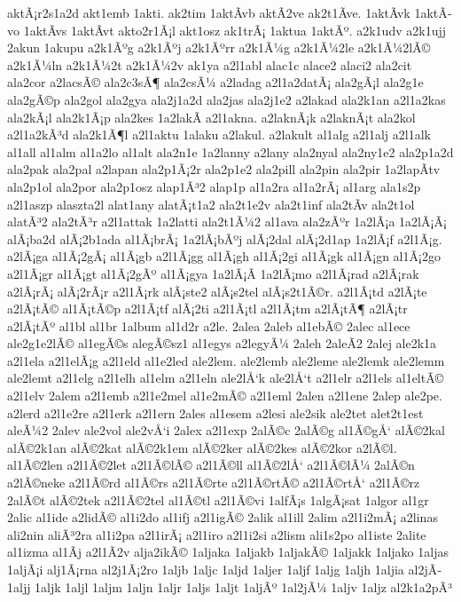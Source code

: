 {aktÃ¡r2s1a2d
akt1emb
1akti.
ak2tim
1aktÃ­vb
aktÃ­2ve
ak2t1Ã­ve.
1aktÃ­vk
1aktÃ­vo
1aktÃ­vs
1aktÃ­vt
akto2r1Ã¡l
akt1osz
ak1trÃ¡
1aktua
1aktÃº.
a2k1udv
a2k1ujj
2akun
1akupu
a2k1Ãºg
a2k1Ãºj
a2k1Ãºrr
a2k1Ã¼g
a2k1Ã¼2le
a2k1Ã¼2lÃ©
a2k1Ã¼ln
a2k1Ã¼2t
a2k1Ã¼2v
ak1ya
a2l1abl
alac1c
alace2
alaci2
ala2cit
ala2cor
a2lacsÃ©
ala2c3sÃ¶
ala2csÃ¼
a2ladag
a2l1a2datÃ¡
ala2gÃ¡l
ala2g1e
ala2gÃ©p
ala2gol
ala2gya
ala2j1a2d
ala2jas
ala2j1e2
a2lakad
ala2k1an
a2l1a2kas
ala2kÃ¡l
ala2k1Ã¡p
ala2kes
1a2lakÃ­
a2l1akna.
a2laknÃ¡k
a2laknÃ¡t
ala2kol
a2l1a2kÃ³d
ala2k1Ã¶l
a2l1aktu
1alaku
a2lakul.
a2lakult
al1alg
a2l1alj
a2l1alk
al1all
al1alm
al1a2lo
al1alt
ala2n1e
1a2lanny
a2lany
ala2nyal
ala2ny1e2
ala2p1a2d
ala2pak
ala2pal
a2lapan
ala2p1Ã¡2r
ala2p1e2
ala2pill
ala2pin
ala2pir
1a2lapÃ­tv
ala2p1ol
ala2por
ala2p1osz
alap1Ã³2
alap1p
al1a2ra
al1a2rÃ¡
al1arg
ala1s2p
a2l1aszp
alaszta2l
alat1any
alatÃ¡t1a2
ala2t1e2v
ala2t1inf
ala2tÃ­v
ala2t1ol
alatÃ³2
ala2tÃ³r
a2l1attak
1a2latti
ala2t1Ã¼2
al1ava
ala2zÃºr
1a2lÃ¡a
1a2lÃ¡Ã¡
alÃ¡ba2d
alÃ¡2b1ada
al1Ã¡brÃ¡
1a2lÃ¡bÃºj
alÃ¡2dal
alÃ¡2d1ap
1a2lÃ¡f
a2l1Ã¡g.
a2lÃ¡ga
al1Ã¡2gÃ¡
al1Ã¡gb
a2l1Ã¡gg
al1Ã¡gh
al1Ã¡2gi
al1Ã¡gk
al1Ã¡gn
al1Ã¡2go
a2l1Ã¡gr
al1Ã¡gt
al1Ã¡2gÃº
al1Ã¡gya
1a2lÃ¡Ã­
1a2lÃ¡mo
a2l1Ã¡rad
a2lÃ¡rak
a2lÃ¡rÃ¡
alÃ¡2rÃ¡r
a2l1Ã¡rk
alÃ¡ste2
alÃ¡s2tel
alÃ¡s2t1Ã©r.
a2l1Ã¡td
a2lÃ¡te
a2lÃ¡tÃ©
al1Ã¡tÃ©p
a2l1Ã¡tf
alÃ¡2ti
a2l1Ã¡tl
a2l1Ã¡tm
a2lÃ¡tÃ¶
a2lÃ¡tr
a2lÃ¡tÃº
al1bl
al1br
1album
al1d2r
a2le.
2alea
2aleb
al1ebÃ©
2alec
al1ece
ale2g1e2lÃ©
al1egÃ©s
alegÃ©sz1
al1egys
a2legyÃ¼
2aleh
2aleÃ­2
2alej
ale2k1a
a2l1ela
a2l1elÃ¡g
a2l1eld
al1e2led
ale2lem.
ale2lemb
ale2leme
ale2lemk
ale2lemm
ale2lemt
a2l1elg
a2l1elh
al1elm
a2l1eln
ale2lÅ‘k
ale2lÅ‘t
a2l1elr
a2l1els
al1eltÃ©
a2l1elv
2alem
a2l1emb
a2l1e2mel
al1e2mÃ©
a2l1eml
2alen
a2l1ene
2alep
ale2pe.
a2lerd
a2l1e2re
a2l1erk
a2l1ern
2ales
al1esem
a2lesi
ale2sik
ale2tet
alet2t1est
aleÃ¼2
2alev
ale2vol
ale2vÅ‘i
2alex
a2l1exp
2alÃ©c
2alÃ©g
al1Ã©gÅ‘
alÃ©2kal
alÃ©2k1an
alÃ©2kat
alÃ©2k1em
alÃ©2ker
alÃ©2kes
alÃ©2kor
a2lÃ©l.
al1Ã©2len
a2l1Ã©2let
a2l1Ã©lÃ©
a2l1Ã©ll
al1Ã©2lÅ‘
a2l1Ã©lÃ¼
2alÃ©n
a2lÃ©neke
a2l1Ã©rd
al1Ã©rs
a2l1Ã©rte
a2l1Ã©rtÃ©
a2l1Ã©rtÅ‘
a2l1Ã©rz
2alÃ©t
alÃ©2tek
a2l1Ã©2tel
al1Ã©tl
a2l1Ã©vi
1alfÃ¡s
1algÃ¡sat
1algor
al1gr
2alic
al1ide
a2lidÃ©
al1i2do
al1ifj
a2l1igÃ©
2alik
al1ill
2alim
a2l1i2mÃ¡
a2linas
ali2nin
aliÃ³2ra
al1i2pa
a2l1irÃ¡
a2l1iro
a2l1i2si
a2lism
ali1s2po
al1iste
2alite
al1izma
al1Ã­j
a2l1Ã­2v
alja2ikÃ©
1aljaka
1aljakb
1aljakÃ©
1aljakk
1aljako
1aljas
1aljÃ¡i
alj1Ã¡rna
al2j1Ã¡2ro
1aljb
1aljc
1aljd
1aljer
1aljf
1aljg
1aljh
1aljia
al2jÃ­
1aljj
1aljk
1aljl
1aljm
1aljn
1aljr
1aljs
1aljt
1aljÃº
1al2jÃ¼
1aljv
1aljz
al2k1a2pÃ³
}
